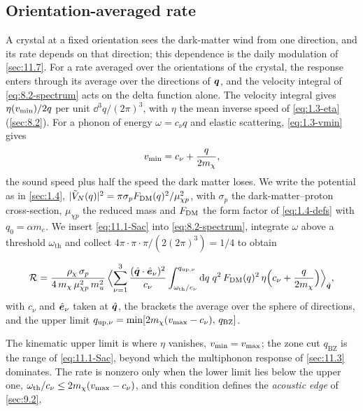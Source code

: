 \subsection{Orientation-averaged rate}

A crystal at a fixed orientation sees the dark-matter wind from one direction, and its rate depends on that direction; this dependence is the daily modulation of \cref{sec:11.7}. For a rate averaged over the orientations of the crystal, the response enters through its average over the directions of $\bm{q}$, and the velocity integral of \cref{eq:8.2-spectrum} acts on the delta function alone. The velocity integral gives $\eta(v_{\mathrm{min}})/2q$ per unit $\dd^3q/(2\pi)^3$, with $\eta$ the mean inverse speed of \cref{eq:1.3-eta} (\cref{sec:8.2}). For a phonon of energy $\omega = c_\nu q$ and elastic scattering, \cref{eq:1.3-vmin} gives
\begin{equation*}
  v_{\mathrm{min}} = c_\nu + \frac{q}{2m_{\chi}} ,
\end{equation*}
the sound speed plus half the speed the dark matter loses. We write the potential as in \cref{sec:1.4}, $|\tilde V_N(q)|^2 = \pi\sigma_pF_{\mathrm{DM}}(q)^2/\mu_{\chi p}^2$, with $\sigma_p$ the dark-matter--proton cross-section, $\mu_{\chi p}$ the reduced mass and $F_{\mathrm{DM}}$ the form factor of \cref{eq:1.4-defs} with $q_0 = \alpha m_e$. We insert \cref{eq:11.1-Sac} into \cref{eq:8.2-spectrum}, integrate $\omega$ above a threshold $\omega_{\mathrm{th}}$ and collect $4\pi\cdot\pi\cdot\pi/(2(2\pi)^3) = 1/4$ to obtain
\begin{keyresult}
\begin{equation}
  \mathcal{R} = \frac{\rho_\chi\,\sigma_p}{4\,m_{\chi}\,\mu_{\chi p}^2\,m_u^2}\,\Bigl\langle\sum_{\nu = 1}^{3}\frac{(\hat{\bm{q}}\cdot\hat{\bm{e}}_\nu)^2}{c_\nu}\int_{\omega_{\mathrm{th}}/c_\nu}^{q_{\mathrm{up},\nu}}\mathrm{d} q\;q^2\,F_{\mathrm{DM}}(q)^2\,\eta\Bigl(c_\nu + \frac{q}{2m_{\chi}}\Bigr)\Bigr\rangle_{\hat{\bm{q}}} ,
  \label{eq:11.1-rate}
\end{equation}
with $c_\nu$ and $\hat{\bm{e}}_\nu$ taken at $\hat{\bm{q}}$, the brackets the average over the sphere of directions, and the upper limit $q_{\mathrm{up},\nu} = \min[2m_{\chi}(v_{\mathrm{max}} - c_\nu),\,q_{\mathrm{BZ}}]$.
\end{keyresult}
\noindent The kinematic upper limit is where $\eta$ vanishes, $v_{\mathrm{min}} = v_{\mathrm{max}}$; the zone cut $q_{\mathrm{BZ}}$ is the range of \cref{eq:11.1-Sac}, beyond which the multiphonon response of \cref{sec:11.3} dominates. The rate is nonzero only when the lower limit lies below the upper one, $\omega_{\mathrm{th}}/c_\nu \le 2m_{\chi}(v_{\mathrm{max}} - c_\nu)$, and this condition defines the \emph{acoustic edge} of \cref{sec:9.2},
